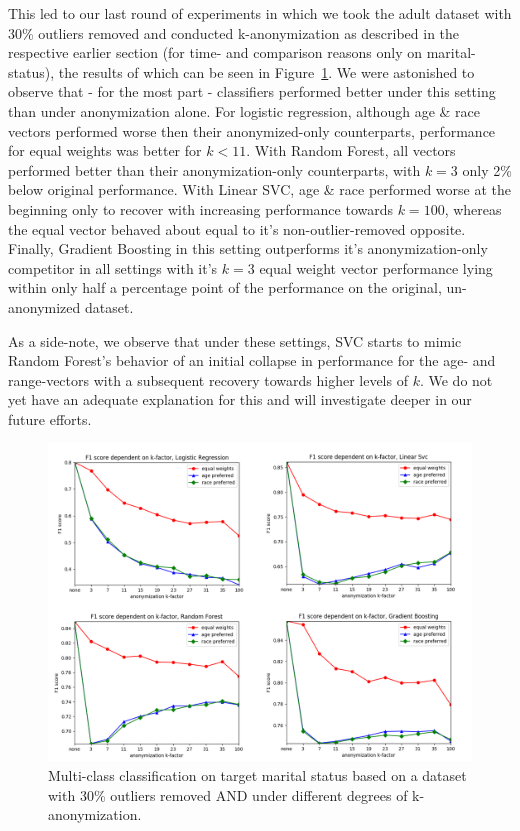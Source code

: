 \documentclass{llncs}
\begin{document}
This led to our last round of experiments in which we took the adult dataset with 30\% outliers removed and conducted k-anonymization as described in the respective earlier section (for time- and comparison reasons only on marital-status), the results of which can be seen in Figure~\ref{fig:results_anonymization_outliers_marital_status}. We were astonished to observe that - for the most part - classifiers performed better under this setting than under anonymization alone. For logistic regression, although age \& race vectors performed worse then their anonymized-only counterparts, performance for equal weights was better for $k<11$. With Random Forest, all vectors performed better than their anonymization-only counterparts, with $k=3$ only 2\% below original performance. With Linear SVC, age \& race performed worse at the beginning only to recover with increasing performance towards $k=100$, whereas the equal vector behaved about equal to it's non-outlier-removed opposite. Finally, Gradient Boosting in this setting outperforms it's anonymization-only competitor in all settings with it's $k=3$ equal weight vector performance lying within only half a percentage point of the performance on the original, un-anonymized dataset.

As a side-note, we observe that under these settings, SVC starts to mimic Random Forest's behavior of an initial collapse in performance for the age- and range-vectors with a subsequent recovery towards higher levels of $k$. We do not yet have an adequate explanation for this and will investigate deeper in our future efforts. 

\begin{figure}[h]
	\centering
	\includegraphics[width=1\textwidth]{figures/anon_outliers/anon_outliers_marital_combined}
	\caption{Multi-class classification on target marital status based on a dataset with 30\% outliers removed AND under different degrees of k-anonymization.}
	\label{fig:results_anonymization_outliers_marital_status}
\end{figure}
\end{document}
